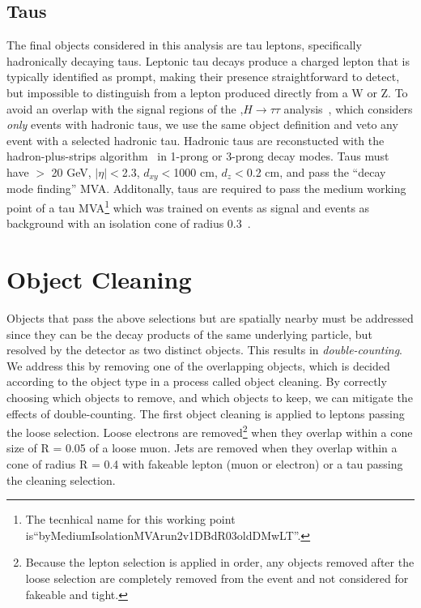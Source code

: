 \subsection{Taus}
The final objects considered in this analysis are tau leptons, specifically hadronically decaying taus. Leptonic tau decays produce a charged lepton that is typically identified as prompt,
making their presence straightforward to detect, but impossible to distinguish from a lepton produced directly from a W or Z. To avoid an overlap with the signal regions of the \tth,$H\rightarrow\tau\tau$
analysis~\cite{CMS-PAS-HIG-17-003}, which considers \emph{only} events with hadronic taus, we use the same object definition and veto any event with a selected hadronic tau. Hadronic taus are
reconstucted with the hadron-plus-strips algorithm~\cite{hps} in 1-prong or 3-prong decay modes. Taus must have \pt $>$ 20 GeV, $|\eta|<$2.3, $d_{xy}<$1000 cm, $d_{z}<$0.2 cm, and pass the
``decay mode finding'' MVA. Additonally, taus are required to pass the medium working point of a tau MVA\footnote{The tecnhical name for this working point is``byMediumIsolationMVArun2v1DBdR03oldDMwLT''.}
which was trained on \tth events as signal and \ttbar events as background with an isolation cone of radius 0.3~\cite{CMS-AN-15-310}. 

\section{Object Cleaning}
Objects that pass the above selections but are spatially nearby must be addressed since they can be
the decay products of the same underlying particle, but resolved by the detector as two distinct objects. This results in \emph{double-counting}.
We address this by removing one of the overlapping objects, which is decided according to the object type in a process called object cleaning. By correctly choosing which objects to remove, and which objects to keep,
we can mitigate the effects of double-counting. The first object cleaning is applied to leptons passing the loose selection. Loose electrons are removed\footnote{Because the lepton selection is applied in
order, any objects removed after the loose selection are completely removed from the event and not considered for fakeable and tight.} when they overlap within a cone size of R = 0.05 of a loose muon. 
Jets are removed when they overlap within a cone of radius R = 0.4 with fakeable lepton (muon or electron) or a tau passing the cleaning selection.
